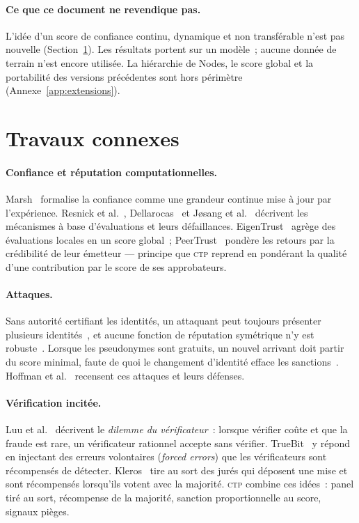 \documentclass[11pt,a4paper]{article}
\theoremstyle{plain}
\theoremstyle{definition}
\theoremstyle{remark}
\newcommand{\CTP}{\textsc{ctp}}
\newcommand{\1}{\mathbf{1}}
\begin{document}
\paragraph{Ce que ce document ne revendique pas.} L'idée d'un score de
confiance continu, dynamique et non transférable n'est pas nouvelle
(Section~\ref{sec:related}). Les résultats portent sur un modèle~; aucune
donnée de terrain n'est encore utilisée. La hiérarchie de Nodes, le score
global et la portabilité des versions précédentes sont hors périmètre
(Annexe~\ref{app:extensions}).

\section{Travaux connexes}
\label{sec:related}

\paragraph{Confiance et réputation computationnelles.} Marsh~\cite{marsh1994}
formalise la confiance comme une grandeur continue mise à jour par
l'expérience. Resnick et al.~\cite{resnick2000}, Dellarocas~\cite{dellarocas2003}
et Jøsang et al.~\cite{josang2007} décrivent les mécanismes à base
d'évaluations et leurs défaillances. EigenTrust~\cite{kamvar2003} agrège des
évaluations locales en un score global~; PeerTrust~\cite{xiong2004} pondère les
retours par la crédibilité de leur émetteur --- principe que \CTP{} reprend en
pondérant la qualité d'une contribution par le score de ses approbateurs.

\paragraph{Attaques.} Sans autorité certifiant les identités, un attaquant peut
toujours présenter plusieurs identités~\cite{douceur2002}, et aucune fonction de
réputation symétrique n'y est robuste~\cite{cheng2005}. Lorsque les pseudonymes
sont gratuits, un nouvel arrivant doit partir du score minimal, faute de quoi
le changement d'identité efface les sanctions~\cite{friedman2001}. Hoffman et
al.~\cite{hoffman2009} recensent ces attaques et leurs défenses.

\paragraph{Vérification incitée.} Luu et al.~\cite{luu2015} décrivent le
\emph{dilemme du vérificateur}~: lorsque vérifier coûte et que la fraude est
rare, un vérificateur rationnel accepte sans vérifier. TrueBit~\cite{teutsch2017}
y répond en injectant des erreurs volontaires (\emph{forced errors}) que les
vérificateurs sont récompensés de détecter. Kleros~\cite{kleros2019} tire au sort
des jurés qui déposent une mise et sont récompensés lorsqu'ils votent avec la
majorité. \CTP{} combine ces idées~: panel tiré au sort, récompense de la
majorité, sanction proportionnelle au score, signaux pièges.
\end{document}
